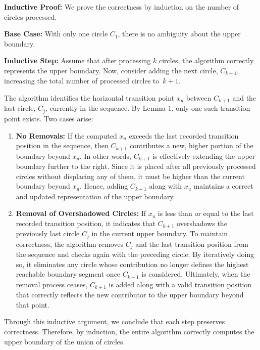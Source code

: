 \documentclass[12pt]{article}
\begin{document}
\textbf{Inductive Proof:} We prove the correctness by induction on the number of circles processed.

\textbf{Base Case:} With only one circle \( C_1 \), there is no ambiguity about the upper boundary.

\textbf{Inductive Step:} Assume that after processing \( k \) circles, the algorithm correctly represents the upper boundary. Now, consider adding the next circle, \( C_{k+1} \), increasing the total number of processed circles to~\( k+1 \).

The algorithm identifies the horizontal transition point \( x_u \) between \( C_{k+1} \) and the last circle, \( C_j \), currently in the sequence. By Lemma 1, only one such transition point exists. Two cases arise:

\begin{enumerate}
	\item \textbf{No Removals:} If the computed \( x_u \) exceeds the last recorded transition position in the sequence, then \( C_{k+1} \) contributes a new, higher portion of the boundary beyond \( x_u \). In other words, \( C_{k+1} \) is effectively extending the upper boundary further to the right. Since it is placed after all previously processed circles without displacing any of them, it must be higher than the current boundary beyond \( x_u \). Hence, adding \( C_{k+1} \) along with \( x_u \) maintains a correct and updated representation of the upper boundary.

	\item \textbf{Removal of Overshadowed Circles:} If \( x_u \) is less than or equal to the last recorded transition position, it indicates that \( C_{k+1} \) overshadows the previously last circle \( C_j \) in the current upper boundary. To maintain correctness, the algorithm removes \( C_j \) and the last transition position from the sequence and checks again with the preceding circle. By iteratively doing so, it eliminates any circle whose contribution no longer defines the highest reachable boundary segment once \( C_{k+1} \) is considered. Ultimately, when the removal process ceases, \( C_{k+1} \) is added along with a valid transition position that correctly reflects the new contributor to the upper boundary beyond that point.
\end{enumerate}

Through this inductive argument, we conclude that each step preserves correctness. Therefore, by induction, the entire algorithm correctly computes the upper boundary of the union of circles.
	
\end{document}
